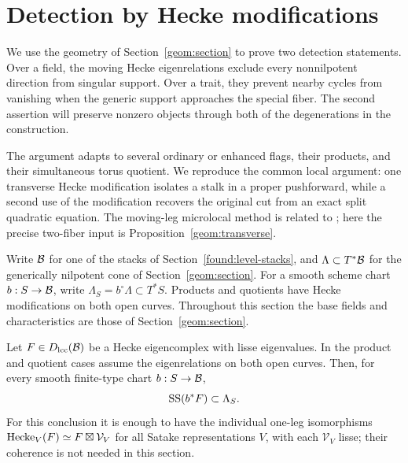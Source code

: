 \section{Detection by Hecke modifications}\label{det:section}

We use the geometry of Section~\ref{geom:section} to prove two detection
statements. Over a field, the moving Hecke eigenrelations exclude every
nonnilpotent direction from singular support. Over a trait, they prevent
nearby cycles from vanishing when the generic support approaches the special
fiber. The second assertion will preserve nonzero objects through both
of the degenerations in the construction.

The argument adapts \cite[Theorems~4.1--4.2 and Lemmas~4.3--4.4]{CT}
to several ordinary or enhanced flags, their products, and their simultaneous
torus quotient. We reproduce the common local argument: one transverse
Hecke modification isolates a stalk in a proper pushforward, while a second
use of the modification recovers the original cut from an exact split
quadratic equation. The moving-leg microlocal method is related to
\cite[Sections~20.5--20.8 and Appendix~H]{AGKRRV}; here the precise two-fiber
input is Proposition~\ref{geom:transverse}.

Write $\mathcal B$ for one of the stacks of Section~\ref{found:level-stacks},
and $\Lambda\subset T^*\mathcal B$ for the generically nilpotent cone
of Section~\ref{geom:section}. For a smooth scheme chart $b:S\to\mathcal B$,
write $\Lambda_S=b^\circ\Lambda\subset T^*S$. Products and quotients
have Hecke modifications on both open curves. Throughout this section the
base fields and characteristics are those of Section~\ref{geom:section}.

\begin{theorem}\label{det:field}
Let $F\in D_{\mathrm{lcc}}(\mathcal B)$ be a Hecke eigencomplex with lisse eigenvalues.
In the product and quotient cases assume the eigenrelations on both open
curves. Then, for every smooth finite-type chart $b:S\to\mathcal B$,
\[
                           \operatorname{SS}(b^*F)\subset\Lambda_S.
\]
For this conclusion it is enough to have the individual one-leg
isomorphisms $\operatorname{Hecke}_V(F)\simeq F\boxtimes\mathcal V_V$ for all Satake
representations $V$, with each $\mathcal V_V$ lisse; their coherence is
not needed in this section.
\end{theorem}

